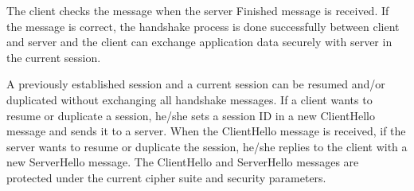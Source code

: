 \documentclass[a4paper,fleqn]{cas-dc}
\begin{document}
The client checks the message when the server Finished message is received. If the message is correct, the handshake process is done successfully between client and server and the client can exchange application data securely with server in the current session.

A previously established session and a current session
can be resumed and/or duplicated without exchanging all handshake messages. If a client wants to resume or duplicate a session, he/she sets a session ID in a new ClientHello message and sends it to a server. When the ClientHello message is received, if the server wants to resume or duplicate the session, he/she replies to the client with a new ServerHello message. The ClientHello and ServerHello messages are protected under the current cipher suite and security parameters. 
\end{document}
